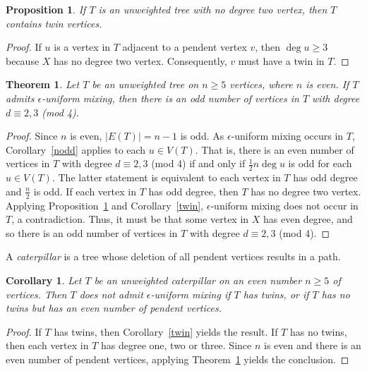 \documentclass[11pt]{article}
\newtheorem{theorem}{Theorem}
\newtheorem{corollary}{Corollary}
\newtheorem{proposition}{Proposition}
\begin{document}
\begin{proposition}
\label{tree2}
If $T$ is an unweighted tree with no degree two vertex, then $T$ contains twin vertices.
\end{proposition}

\begin{proof}
If $u$ is a vertex in $T$ adjacent to a pendent vertex $v$, then $\operatorname{deg}u\geq 3$ because $X$ has no degree two vertex. Consequently, $v$ must have a twin in $T$.
\end{proof}

\begin{theorem}
\label{tree1}
Let $T$ be an unweighted tree on $n\geq 5$ vertices, where $n$ is even. If $T$ admits $\epsilon$-uniform mixing, then there is an odd number of vertices in $T$ with degree $d\equiv 2,3$ (mod 4).
\end{theorem}

\begin{proof}
Since $n$ is even, $|E(T)|=n-1$ is odd. As $\epsilon$-uniform mixing occurs in $T$, Corollary~\ref{nodd} applies to each $u\in V(T)$. That is, there is an even number of vertices in $T$ with degree $d\equiv 2,3$ (mod 4) if and only if $\frac{1}{2}n\operatorname{deg}u$ is odd for each $u\in V(T)$. The latter statement is equivalent to each vertex in $T$ has odd degree and $\frac{n}{2}$ is odd. If each vertex in $T$ has odd degree, then $T$ has no degree two vertex. Applying Proposition~\ref{tree2} and Corollary~\ref{twin}, $\epsilon$-uniform mixing does not occur in $T$, a contradiction. Thus, it must be that some vertex in $X$ has even degree, and so there is an odd number of vertices in $T$ with degree $d\equiv 2,3$ (mod 4).
\end{proof}

A \textit{caterpillar} is a tree whose deletion of all pendent vertices results in a path.

\begin{corollary}
\label{27}
Let $T$ be an unweighted caterpillar on an even number $n\geq 5$ of vertices. Then $T$ does not admit $\epsilon$-uniform mixing if $T$ has twins, or if $T$ has no twins but has an even number of pendent vertices.
\end{corollary}

\begin{proof}
If $T$ has twins, then Corollary~\ref{twin} yields the result. If $T$ has no twins, then each vertex in $T$ has degree one, two or three. Since $n$ is even and there is an even number of pendent vertices, applying Theorem~\ref{tree1} yields the conclusion.
\end{proof}
\end{document}
